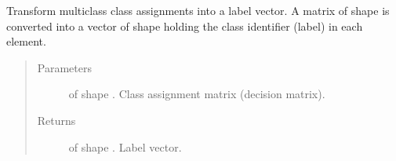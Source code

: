 \documentclass[letterpaper,10pt,english]{sphinxmanual}
\begin{document}
\begin{fulllineitems}
\label{\detokenize{pusion.util.transformer:pusion.util.transformer.class_assignment_matrix_to_label_vector}}
\sphinxAtStartPar
Transform multiclass class assignments into a label vector. A matrix of shape
 is converted into a vector of shape  holding the class identifier (label)
in each element.
\begin{quote}\begin{description}
\item[{Parameters}] \leavevmode
\sphinxAtStartPar
{} \textendash{}  of shape . Class assignment matrix
(decision matrix).

\item[{Returns}] \leavevmode
\sphinxAtStartPar
{} of shape . Label vector.

\end{description}\end{quote}

\end{fulllineitems}

\end{document}
